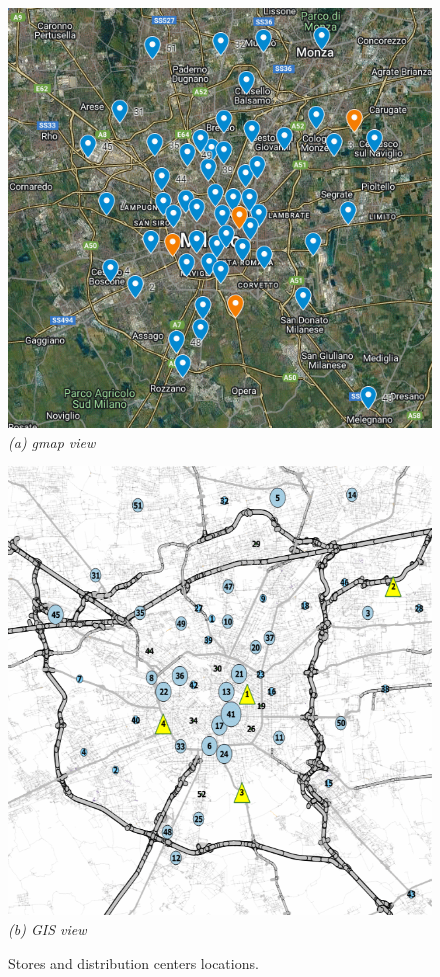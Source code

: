 \documentclass[preprint,11pt,authoryear]{elsarticle}
\begin{document}
\begin{figure}[ht]
	\centering
	\begin{minipage}{0.48\textwidth}
		\centering
		\includegraphics[width=\linewidth]{gmap.png}
		\vspace{0.5em}
		\textit{(a) gmap view}
	\end{minipage}
	\hfill
	\begin{minipage}{0.48\textwidth}
		\centering
		\includegraphics[width=\linewidth]{qgis.png}
		\vspace{0.5em}
		\textit{(b) GIS view}
	\end{minipage}
	\caption{Stores and distribution centers locations.}
	\label{fig:locations}
\end{figure}
\end{document}
